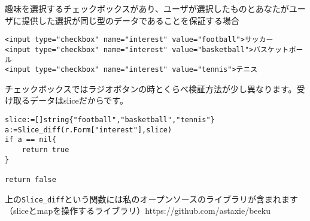 趣味を選択するチェックボックスがあり、ユーザが選択したものとあなたがユーザに提供した選択が同じ型のデータであることを保証する場合

\begin{lstlisting}[numbers=none]
<input type="checkbox" name="interest" value="football">サッカー
<input type="checkbox" name="interest" value="basketball">バスケットボール
<input type="checkbox" name="interest" value="tennis">テニス
\end{lstlisting}

チェックボックスではラジオボタンの時とくらべ検証方法が少し異なります。受け取るデータはsliceだからです。

\begin{lstlisting}[numbers=none]
slice:=[]string{"football","basketball","tennis"}
a:=Slice_diff(r.Form["interest"],slice)
if a == nil{
    return true
}

return false
\end{lstlisting}

上の\texttt{Slice\_diff}という関数には私のオープンソースのライブラリが含まれます（sliceとmapを操作するライブラリ）https://github.com/astaxie/beeku

